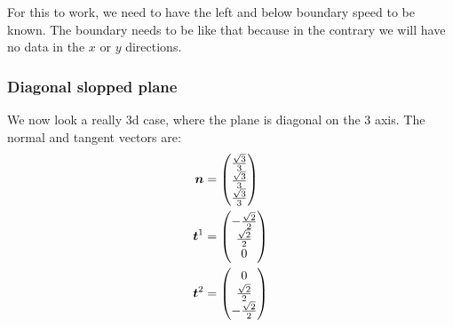 % 
% 


For this to work, we need to have the left and below boundary speed to be known.
The boundary needs to be like that because in the contrary we will have no data in the $x$ or $y$ directions.


\subsubsection{Diagonal slopped plane}

We now look a really 3d case, where the plane is diagonal on the 3 axis.
The normal and tangent vectors are:
\begin{align}
	{\boldsymbol {n}}&=\begin{pmatrix}
		\frac{\sqrt{3}}{3}\\
		\frac{\sqrt{3}}{3}\\
		\frac{\sqrt{3}}{3}
	\end{pmatrix}\\
	{\boldsymbol {t}}^1&=\begin{pmatrix}
			-\frac{\sqrt{2}}{2}\\
			\frac{\sqrt{2}}{2}\\
			0
		\end{pmatrix}\\
		{\boldsymbol {t}}^2&=\begin{pmatrix}
			0\\
			\frac{\sqrt{2}}{2}\\
			-\frac{\sqrt{2}}{2}
		\end{pmatrix}
\end{align}

